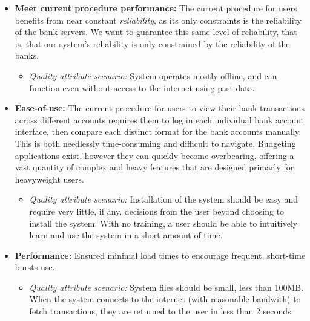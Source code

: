 \documentclass[11pt]{article}
\newcounter{use case ID}
\begin{document}

\begin{itemize}
    \item \textbf{Meet current procedure performance:} The current procedure for users benefits from near constant \textit{reliability}, as its only constraints is the reliability of the bank servers. We want to guarantee this same level of reliability, that is, that our system's reliability is only constrained by the reliability of the banks. %
    \begin{itemize}
        \item \textit{Quality attribute scenario:} System operates mostly offline, and can function even without access to the internet using past data.
    \end{itemize}
    \item \textbf{Ease-of-use:} The current procedure for users to view their bank transactions across different accounts requires them to log in each individual bank account interface, then compare each distinct format for the bank accounts manually. This is both needlessly time-consuming and difficult to navigate. Budgeting applications exist, however they can quickly become overbearing, offering a vast quantity of complex and heavy features that are designed primarly for heavyweight users.
        \begin{itemize}
            \item \textit{Quality attribute scenario:} Installation of the system should be easy and require very little, if any, decisions from the user beyond choosing to install the system. With no training, a user should be able to intuitively learn and use the system in a short amount of time.
        \end{itemize}
    \item \textbf{Performance:} Ensured minimal load times to encourage frequent, short-time bursts use.
        \begin{itemize}
            \item \textit{Quality attribute scenario:} System files should be small, less than 100MB. When the system connects to the internet (with reasonable bandwith) to fetch transactions, they are returned to the user in less than 2 seconds.

\end{itemize}
\end{itemize}
\end{document}
